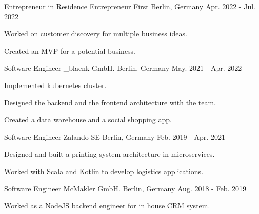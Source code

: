 


\begin{cventries}

\cventry
{Entrepreneur in Residence}
{Entrepreneur First}
{Berlin, Germany}
{Apr. 2022 - Jul. 2022}
{
  \begin{cvitems}
    \item {Worked on customer discovery for multiple business ideas.}
    \item {Created an MVP for a potential business.}
  \end{cvitems}
}


\cventry
{Software Engineer}
{\_blaenk GmbH.}
{Berlin, Germany}
{May. 2021 - Apr. 2022}
{
  \begin{cvitems}
    \item {Implemented kubernetes cluster.}
    \item {Designed the backend and the frontend architecture with the team.}
    \item {Created a data warehouse and a social shopping app.}
  \end{cvitems}
}

  \cventry
    {Software Engineer}
    {Zalando SE}
    {Berlin, Germany}
    {Feb. 2019 - Apr. 2021}
    {
      \begin{cvitems}
        \item {Designed and built a printing system architecture in microservices.}
        \item {Worked with Scala and Kotlin to develop logistics applications.}
      \end{cvitems}
    }


  \cventry
    {Software Engineer}
    {McMakler GmbH.}
    {Berlin, Germany}
    {Aug. 2018 - Feb. 2019}
    {
      \begin{cvitems}
        \item {Worked as a NodeJS backend engineer for in house CRM system.}
      \end{cvitems}
    }


\end{cventries}
